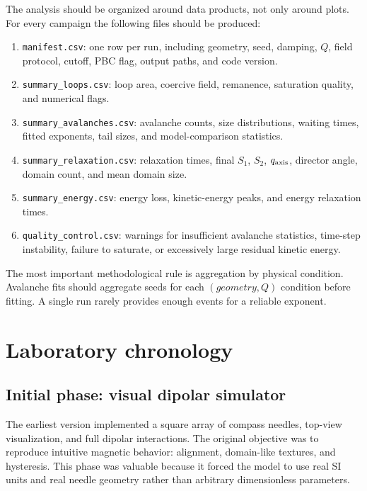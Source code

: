 \documentclass[11pt,a4paper]{article}
\newcommand{\code}[1]{\texttt{#1}}
\begin{document}
The analysis should be organized around data products, not only around plots. For every campaign the following files should be produced:

\begin{enumerate}[leftmargin=*]
\item \code{manifest.csv}: one row per run, including geometry, seed, damping, $Q$, field protocol, cutoff, PBC flag, output paths, and code version.
\item \code{summary\_loops.csv}: loop area, coercive field, remanence, saturation quality, and numerical flags.
\item \code{summary\_avalanches.csv}: avalanche counts, size distributions, waiting times, fitted exponents, tail sizes, and model-comparison statistics.
\item \code{summary\_relaxation.csv}: relaxation times, final $S_1$, $S_2$, $q_{\rm axis}$, director angle, domain count, and mean domain size.
\item \code{summary\_energy.csv}: energy loss, kinetic-energy peaks, and energy relaxation times.
\item \code{quality\_control.csv}: warnings for insufficient avalanche statistics, time-step instability, failure to saturate, or excessively large residual kinetic energy.
\end{enumerate}

The most important methodological rule is aggregation by physical condition. Avalanche fits should aggregate seeds for each $(geometry,Q)$ condition before fitting. A single run rarely provides enough events for a reliable exponent.

\section{Laboratory chronology}
\label{sec:chronology}

\subsection{Initial phase: visual dipolar simulator}

The earliest version implemented a square array of compass needles, top-view visualization, and full dipolar interactions. The original objective was to reproduce intuitive magnetic behavior: alignment, domain-like textures, and hysteresis. This phase was valuable because it forced the model to use real SI units and real needle geometry rather than arbitrary dimensionless parameters.
\end{document}
